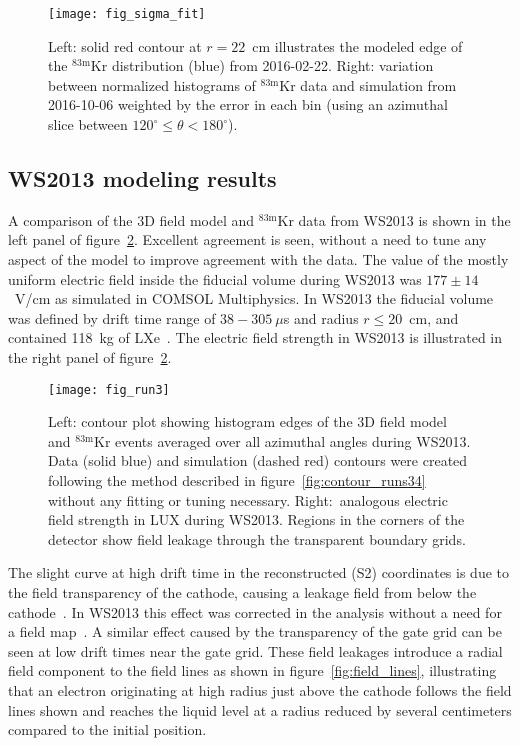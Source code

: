 \documentclass[11pt,a4paper]{article}
\newcommand{\isot}[2]{$^{\textrm{#2}}$#1 }
\newcommand{\krm}{\isot{Kr}{83m}}
\begin{document}
\begin{figure}[ht!]
\begin{center}
\texttt{[image: fig\_sigma\_fit]}
\caption{Left: solid red contour at $r=22$~cm illustrates the modeled edge of the \krm distribution (blue) from 2016-02-22. Right: variation between normalized histograms of \krm data and simulation from 2016-10-06 weighted by the error in each bin (using an azimuthal slice between $120^{\circ} \leq \theta < 180^{\circ}$).}
\label{fig:sigma_fit}
\end{center} 
\end{figure}


\subsection{WS2013 modeling results}

A comparison of the 3D field model and \krm data from WS2013 is shown in the left panel of figure~\ref{fig:run3}. Excellent agreement is seen, without a need to tune any aspect of the model to improve agreement with the data. The value of the mostly uniform electric field inside the fiducial volume during WS2013 was $177\pm14$~V/cm as simulated in \textsc{COMSOL} Multiphysics. In WS2013 the fiducial volume was defined by drift time range of $38-305~\mu$s and radius $r\leq20$~cm, and contained 118~kg of LXe~\cite{Akerib:2015rjg}. The electric field strength in WS2013 is illustrated in the right panel of figure~\ref{fig:run3}.

\begin{figure}[ht!]
\begin{center}
\texttt{[image: fig\_run3]}
\caption{Left: contour plot showing histogram edges of the 3D field model and \krm events averaged over all azimuthal angles during WS2013. Data (solid blue) and simulation (dashed red) contours were created following the method described in figure~\ref{fig:contour_runs34} without any fitting or tuning necessary. Right:~analogous electric field strength in LUX during WS2013. Regions in the corners of the detector show field leakage through the transparent boundary grids.}
\label{fig:run3}
\end{center} 
\end{figure}

The slight curve at high drift time in the reconstructed (S2) coordinates is due to the field transparency of the cathode, causing a leakage field from below the cathode~\cite{mei2012direct}. In WS2013 this effect was corrected in the analysis without a need for a field map~\cite{scott_krm}. A similar effect caused by the transparency of the gate grid can be seen at low drift times near the gate grid. These field leakages introduce a radial field component to the field lines as shown in figure~\ref{fig:field_lines}, illustrating that an electron originating at high radius just above the cathode follows the field lines shown and reaches the liquid level at a radius reduced by several centimeters compared to the initial position. 
\end{document}
